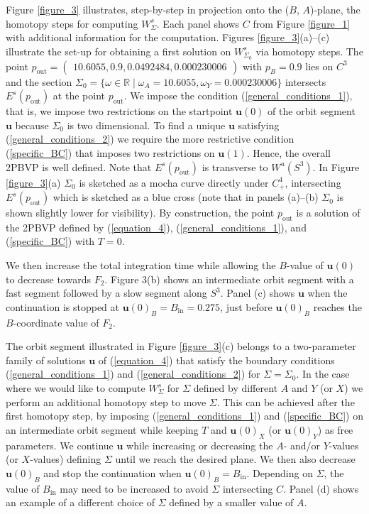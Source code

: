 \documentclass{ws-ijbc}
\begin{document}
Figure \ref{figure_3} illustrates, step-by-step in projection onto the ($B$, $A$)-plane, the homotopy steps for computing $W^s_\Sigma$.  Each panel shows $C$ from Figure \ref{figure_1} with additional information for the computation.  Figures \ref{figure_3}(a)--(c) illustrate the set-up for obtaining a first solution on $W^s_{\Sigma_0}$ via homotopy steps.  The point $p_{\text{out}}=\begin{pmatrix} 10.6055, 0.9, 0.0492484, 0.000230006 \end{pmatrix}$ with $p_B=0.9$ lies on $C^3$ and the section $\Sigma_0=\{\omega \in \mathbb{R} \; | \;  \omega_A=10.6055, \omega_Y=0.000230006\}$ intersects $E^s(p_\text{out})$ at the point $p_{\text{out}}$.  We impose the condition (\ref{general_conditions_1}), that is, we impose two restrictions on the startpoint $\mathbf{u}(0)$ of the orbit segment $\mathbf{u}$ because $\Sigma_0$ is two dimensional.  To find a unique $\mathbf{u}$ satisfying (\ref{general_conditions_2}) we require the more restrictive condition (\ref{specific_BC}) that imposes two restrictions on $\mathbf{u}(1)$.  Hence, the overall 2PBVP is well defined.  Note that $E^s(p_{\text{out}})$ is transverse to $W^u(S^3)$.  In Figure \ref{figure_3}(a) $\Sigma_0$ is sketched as a mocha curve directly under $C^4_+$, intersecting $E^s(p_{\text{out}})$ which is sketched as a blue cross (note that in panels (a)--(b) $\Sigma_0$ is shown slightly lower for visibility).  By construction, the point $p_{\text{out}}$ is a solution of the 2PBVP defined by (\ref{equation_4}), (\ref{general_conditions_1}), and (\ref{specific_BC}) with $T=0$.

We then increase the total integration time while allowing the $B$-value of $\mathbf{u}(0)$ to decrease towards $F_2$.  Figure 3(b) shows an intermediate orbit segment with a fast segment followed by a slow segment along $S^3$.  Panel (c) shows $\mathbf{u}$ when the continuation is stopped at $\mathbf{u}(0)_B = B_{\text{in}}=0.275$, just before $\mathbf{u}(0)_B$ reaches the $B$-coordinate value of $F_2$.
    
The orbit segment illustrated in Figure \ref{figure_3}(c) belongs to a two-parameter family of solutions $\mathbf{u}$ of (\ref{equation_4}) that satisfy the boundary conditions (\ref{general_conditions_1}) and (\ref{general_conditions_2}) for $\Sigma=\Sigma_0$.  In the case where we would like to compute $W^{s}_{\Sigma}$ for $\Sigma$ defined by different $A$ and $Y$ (or $X$) we perform an additional homotopy step to move $\Sigma$.  This can be achieved after the first homotopy step, by imposing (\ref{general_conditions_1}) and (\ref{specific_BC}) on an intermediate orbit segment while keeping $T$ and $\mathbf{u}(0)_X$ (or $\mathbf{u}(0)_Y$) as free parameters.  We continue $\mathbf{u}$ while increasing or decreasing the $A$- and/or $Y$-values (or $X$-values) defining $\Sigma$ until we reach the desired plane.  We then also decrease $\mathbf{u}(0)_B$ and stop the continuation when $\mathbf{u}(0)_B = B_{\text{in}}$.  Depending on $\Sigma$, the value of $B_{\text{in}}$ may need to be increased to avoid $\Sigma$ intersecting $C$.  Panel (d) shows an example of a different choice of $\Sigma$ defined by a smaller value of $A$.
\end{document}
